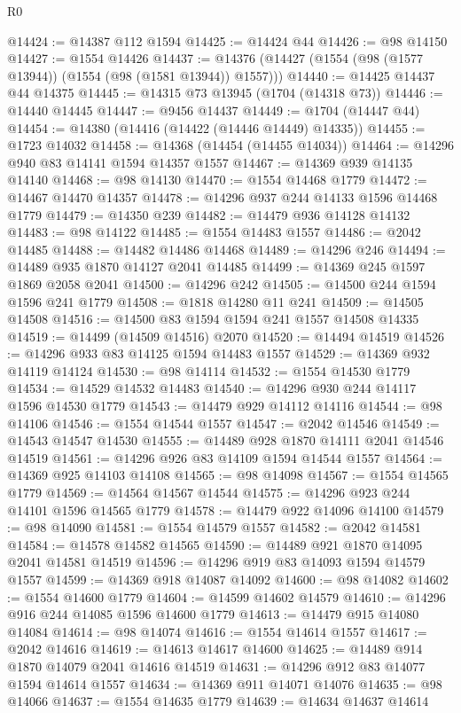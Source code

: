 \begin{lexlean}{R0}
\begin{coremodule}
@14424 := @14387 @112 @1594
@14425 := @14424 @44
@14426 := @98 @14150
@14427 := @1554 @14426
@14437 := @14376 (@14427 (@1554 (@98 (@1577 @13944)) (@1554 (@98 (@1581 @13944)) @1557)))
@14440 := @14425 @14437 @44 @14375
@14445 := @14315 @73 @13945 (@1704 (@14318 @73))
@14446 := @14440 @14445
@14447 := @9456 @14437
@14449 := @1704 (@14447 @44)
@14454 := @14380 (@14416 (@14422 (@14446 @14449) @14335))
@14455 := @1723 @14032
@14458 := @14368 (@14454 (@14455 @14034))
@14464 := @14296 @940 @83 @14141 @1594 @14357 @1557
@14467 := @14369 @939 @14135 @14140
@14468 := @98 @14130
@14470 := @1554 @14468 @1779
@14472 := @14467 @14470 @14357
@14478 := @14296 @937 @244 @14133 @1596 @14468 @1779
@14479 := @14350 @239
@14482 := @14479 @936 @14128 @14132
@14483 := @98 @14122
@14485 := @1554 @14483 @1557
@14486 := @2042 @14485
@14488 := @14482 @14486 @14468
@14489 := @14296 @246
@14494 := @14489 @935 @1870 @14127 @2041 @14485
@14499 := @14369 @245 @1597 @1869 @2058 @2041
@14500 := @14296 @242
@14505 := @14500 @244 @1594 @1596 @241 @1779
@14508 := @1818 @14280 @11 @241
@14509 := @14505 @14508
@14516 := @14500 @83 @1594 @1594 @241 @1557 @14508 @14335
@14519 := @14499 (@14509 @14516) @2070
@14520 := @14494 @14519
@14526 := @14296 @933 @83 @14125 @1594 @14483 @1557
@14529 := @14369 @932 @14119 @14124
@14530 := @98 @14114
@14532 := @1554 @14530 @1779
@14534 := @14529 @14532 @14483
@14540 := @14296 @930 @244 @14117 @1596 @14530 @1779
@14543 := @14479 @929 @14112 @14116
@14544 := @98 @14106
@14546 := @1554 @14544 @1557
@14547 := @2042 @14546
@14549 := @14543 @14547 @14530
@14555 := @14489 @928 @1870 @14111 @2041 @14546 @14519
@14561 := @14296 @926 @83 @14109 @1594 @14544 @1557
@14564 := @14369 @925 @14103 @14108
@14565 := @98 @14098
@14567 := @1554 @14565 @1779
@14569 := @14564 @14567 @14544
@14575 := @14296 @923 @244 @14101 @1596 @14565 @1779
@14578 := @14479 @922 @14096 @14100
@14579 := @98 @14090
@14581 := @1554 @14579 @1557
@14582 := @2042 @14581
@14584 := @14578 @14582 @14565
@14590 := @14489 @921 @1870 @14095 @2041 @14581 @14519
@14596 := @14296 @919 @83 @14093 @1594 @14579 @1557
@14599 := @14369 @918 @14087 @14092
@14600 := @98 @14082
@14602 := @1554 @14600 @1779
@14604 := @14599 @14602 @14579
@14610 := @14296 @916 @244 @14085 @1596 @14600 @1779
@14613 := @14479 @915 @14080 @14084
@14614 := @98 @14074
@14616 := @1554 @14614 @1557
@14617 := @2042 @14616
@14619 := @14613 @14617 @14600
@14625 := @14489 @914 @1870 @14079 @2041 @14616 @14519
@14631 := @14296 @912 @83 @14077 @1594 @14614 @1557
@14634 := @14369 @911 @14071 @14076
@14635 := @98 @14066
@14637 := @1554 @14635 @1779
@14639 := @14634 @14637 @14614

\end{coremodule}
\end{lexlean}
